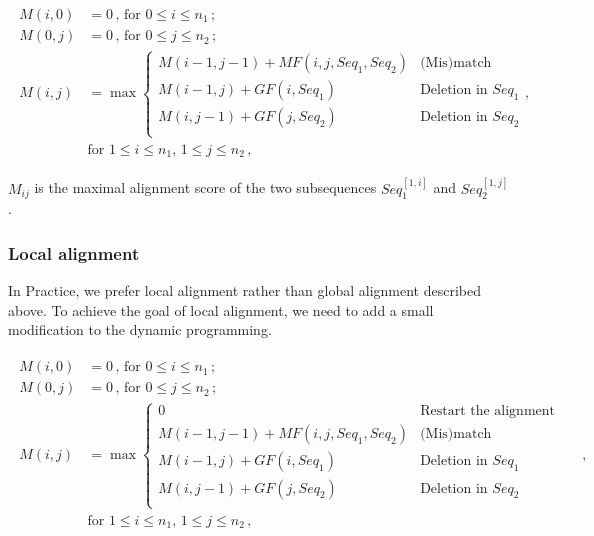 \documentclass[a4paper]{article}
\begin{document}
\begin{CJK*}{UTF8}{kai}
\begin{align}
\begin{split}
M(i,0)&=0\,,\, \text{for } 0 \leq i \leq n_1\,;\\ 
M(0,j)&=0\,,\, \text{for } 0 \leq j \leq n_2\,;\\ 
M(i,j)&=\max \left\{ \begin{array}{ll}
M(i-1,j-1)+MF\left(i,j,Seq_1,Seq_2\right) &  \text{(Mis)match} \\
M(i-1,j)+GF(i,Seq_1) & \text{Deletion in } Seq_1 \\
M(i,j-1)+GF(j,Seq_2) & \text{Deletion in } Seq_2 \\
\end{array},\, \right. \\ 
& \text{for }  1 \leq i \leq n_1,\, 1 \leq j \leq n_2\,,
\end{split} 
\end{align}

$M_{ij}$ is the maximal alignment score of the two subsequences $Seq_1^{[1,i]}$ and $Seq_2^{[1,j]}$.

\subsubsection{Local alignment} 

In Practice, we prefer local alignment rather than global alignment described above. To achieve the goal of local alignment, we need to add a small modification to the dynamic programming.

\begin{align}
\begin{split}
M(i,0)&=0\,,\, \text{for } 0 \leq i \leq n_1\,;\\ 
M(0,j)&=0\,,\, \text{for } 0 \leq j \leq n_2\,;\\ 
M(i,j)&=\max \left\{ \begin{array}{ll}
0 & \text{Restart the alignment from here} \\
M(i-1,j-1)+MF\left(i,j,Seq_1,Seq_2\right) &  \text{(Mis)match} \\
M(i-1,j)+GF(i,Seq_1) & \text{Deletion in } Seq_1 \\
M(i,j-1)+GF(j,Seq_2) & \text{Deletion in } Seq_2 \\
\end{array},\, \right. \\ 
& \text{for }  1 \leq i \leq n_1,\, 1 \leq j \leq n_2\,,
\end{split} 
\end{align}


\end{CJK*}
\end{document}
